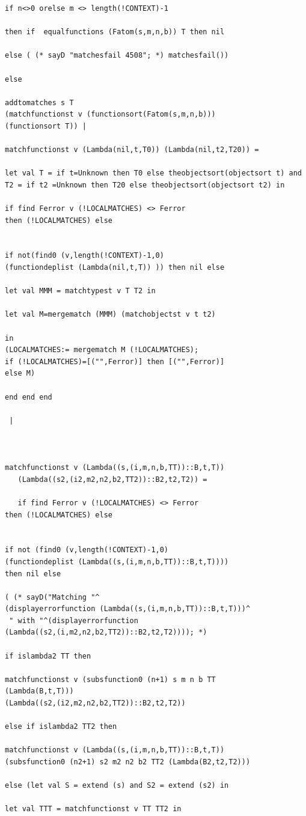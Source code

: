 \documentclass[12pt]{article}
\begin{document}
\begin{verbatim}
if n<>0 orelse m <> length(!CONTEXT)-1

then if  equalfunctions (Fatom(s,m,n,b)) T then nil

else ( (* sayD "matchesfail 4508"; *) matchesfail())

else 

addtomatches s T 
(matchfunctionst v (functionsort(Fatom(s,m,n,b))) 
(functionsort T)) |

matchfunctionst v (Lambda(nil,t,T0)) (Lambda(nil,t2,T20)) =

let val T = if t=Unknown then T0 else theobjectsort(objectsort t) and
T2 = if t2 =Unknown then T20 else theobjectsort(objectsort t2) in

if find Ferror v (!LOCALMATCHES) <> Ferror 
then (!LOCALMATCHES) else


if not(find0 (v,length(!CONTEXT)-1,0) 
(functiondeplist (Lambda(nil,t,T)) )) then nil else

let val MMM = matchtypest v T T2 in

let val M=mergematch (MMM) (matchobjectst v t t2)

in
(LOCALMATCHES:= mergematch M (!LOCALMATCHES);
if (!LOCALMATCHES)=[("",Ferror)] then [("",Ferror)]
else M)

end end end

 |
 
 

matchfunctionst v (Lambda((s,(i,m,n,b,TT))::B,t,T))
   (Lambda((s2,(i2,m2,n2,b2,TT2))::B2,t2,T2)) =
   
   if find Ferror v (!LOCALMATCHES) <> Ferror 
then (!LOCALMATCHES) else

   
if not (find0 (v,length(!CONTEXT)-1,0) 
(functiondeplist (Lambda((s,(i,m,n,b,TT))::B,t,T)))) 
then nil else

( (* sayD("Matching "^
(displayerrorfunction (Lambda((s,(i,m,n,b,TT))::B,t,T)))^
 " with "^(displayerrorfunction 
(Lambda((s2,(i,m2,n2,b2,TT2))::B2,t2,T2)))); *)

if islambda2 TT then

matchfunctionst v (subsfunction0 (n+1) s m n b TT 
(Lambda(B,t,T)))
(Lambda((s2,(i2,m2,n2,b2,TT2))::B2,t2,T2))

else if islambda2 TT2 then

matchfunctionst v (Lambda((s,(i,m,n,b,TT))::B,t,T)) 
(subsfunction0 (n2+1) s2 m2 n2 b2 TT2 (Lambda(B2,t2,T2)))

else (let val S = extend (s) and S2 = extend (s2) in

let val TTT = matchfunctionst v TT TT2 in


\end{verbatim}
\end{document}
